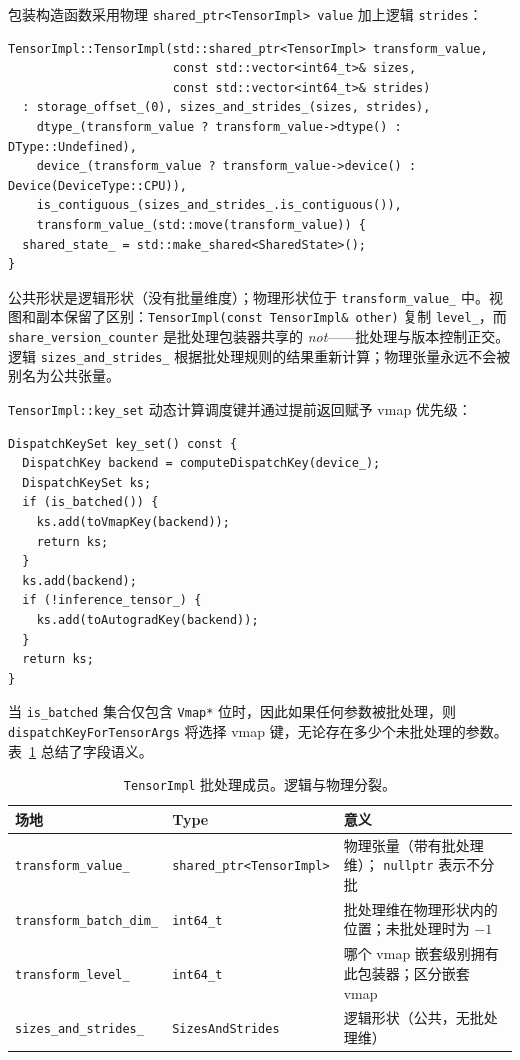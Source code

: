 包装构造函数采用物理 \texttt{shared\_ptr<TensorImpl> value} 加上逻辑 \texttt{strides}：

\begin{lstlisting}[caption={wrapper construction.}, label=lst:wrapperctor]
TensorImpl::TensorImpl(std::shared_ptr<TensorImpl> transform_value,
                       const std::vector<int64_t>& sizes,
                       const std::vector<int64_t>& strides)
  : storage_offset_(0), sizes_and_strides_(sizes, strides),
    dtype_(transform_value ? transform_value->dtype() : DType::Undefined),
    device_(transform_value ? transform_value->device() : Device(DeviceType::CPU)),
    is_contiguous_(sizes_and_strides_.is_contiguous()),
    transform_value_(std::move(transform_value)) {
  shared_state_ = std::make_shared<SharedState>();
}
\end{lstlisting}

公共形状是逻辑形状（没有批量维度）；物理形状位于 \texttt{transform\_value\_} 中。视图和副本保留了区别：\texttt{TensorImpl(const TensorImpl\& other)} 复制 \texttt{level\_}，而 \texttt{share\_version\_counter} 是批处理包装器共享的 \emph{not}——批处理与版本控制正交。逻辑 \texttt{sizes\_and\_strides\_} 根据批处理规则的结果重新计算；物理张量永远不会被别名为公共张量。

\texttt{TensorImpl::key\_set} 动态计算调度键并通过提前返回赋予 vmap 优先级：

\begin{lstlisting}[caption={computed key set, vmap first.}, label=lst:keysetvmap]
DispatchKeySet key_set() const {
  DispatchKey backend = computeDispatchKey(device_);
  DispatchKeySet ks;
  if (is_batched()) {
    ks.add(toVmapKey(backend));
    return ks;
  }
  ks.add(backend);
  if (!inference_tensor_) {
    ks.add(toAutogradKey(backend));
  }
  return ks;
}
\end{lstlisting}

当 \texttt{is\_batched} 集合仅包含 \texttt{Vmap*} 位时，因此如果任何参数被批处理，则 \texttt{dispatchKeyForTensorArgs} 将选择 vmap 键，无论存在多少个未批处理的参数。表~\ref{tab:batchfields} 总结了字段语义。

\begin{table}[H]
\centering
\caption{\texttt{TensorImpl} 批处理成员。逻辑与物理分裂。}
\label{tab:batchfields}
\small
\begin{tabular}{lll}
\toprule
场地 & Type & 意义 \\
\midrule
\texttt{transform\_value\_} & \texttt{shared\_ptr<TensorImpl>} & 物理张量（带有批处理维）； \texttt{nullptr} 表示不分批 \\
\texttt{transform\_batch\_dim\_} & \texttt{int64\_t} & 批处理维在物理形状内的位置；未批处理时为 $-1$ \\
\texttt{transform\_level\_} & \texttt{int64\_t} & 哪个 vmap 嵌套级别拥有此包装器；区分嵌套 vmap \\
\texttt{sizes\_and\_strides\_} & \texttt{SizesAndStrides} & 逻辑形状（公共，无批处理维） \\
\bottomrule
\end{tabular}
\end{table}

